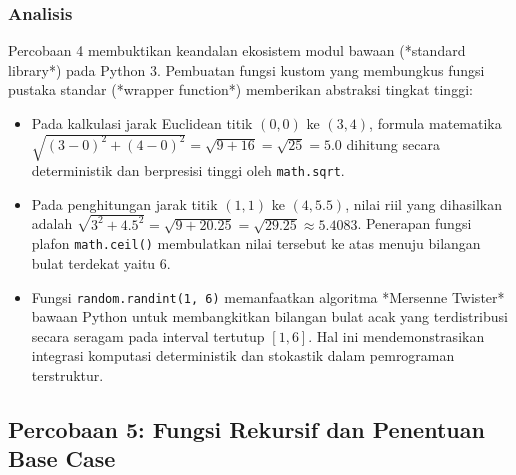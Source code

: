 \documentclass[12pt,a4paper]{article}
\begin{document}
\subsubsection{Analisis}
Percobaan 4 membuktikan keandalan ekosistem modul bawaan (*standard library*) pada Python 3. Pembuatan fungsi kustom yang membungkus fungsi pustaka standar (*wrapper function*) memberikan abstraksi tingkat tinggi:
\begin{itemize}
    \item Pada kalkulasi jarak Euclidean titik $(0,0)$ ke $(3,4)$, formula matematika $\sqrt{(3-0)^2 + (4-0)^2} = \sqrt{9+16} = \sqrt{25} = 5.0$ dihitung secara deterministik dan berpresisi tinggi oleh \texttt{math.sqrt}.
    \item Pada penghitungan jarak titik $(1,1)$ ke $(4, 5.5)$, nilai riil yang dihasilkan adalah $\sqrt{3^2 + 4.5^2} = \sqrt{9 + 20.25} = \sqrt{29.25} \approx 5.4083$. Penerapan fungsi plafon \texttt{math.ceil()} membulatkan nilai tersebut ke atas menuju bilangan bulat terdekat yaitu $6$.
    \item Fungsi \texttt{random.randint(1, 6)} memanfaatkan algoritma *Mersenne Twister* bawaan Python untuk membangkitkan bilangan bulat acak yang terdistribusi secara seragam pada interval tertutup $[1, 6]$. Hal ini mendemonstrasikan integrasi komputasi deterministik dan stokastik dalam pemrograman terstruktur.
\end{itemize}

\subsection{Percobaan 5: Fungsi Rekursif dan Penentuan Base Case}
\end{document}
